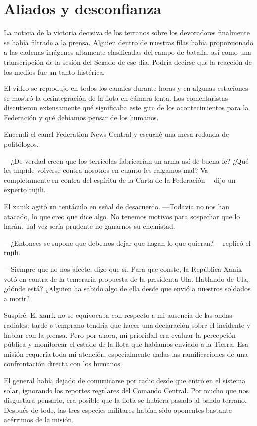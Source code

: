\chapter{Aliados y desconfianza}\label{sec:aliados-desconfianza}

La noticia de la victoria decisiva de los terranos sobre los devoradores finalmente se había filtrado a la prensa. Alguien dentro de nuestras filas había proporcionado a las cadenas imágenes altamente clasificadas del campo de batalla, así como una transcripción de la sesión del Senado de ese día. Podría decirse que la reacción de los medios fue un tanto histérica.

El video se reprodujo en todos los canales durante horas y en algunas estaciones se mostró la desintegración de la flota en cámara lenta. Los comentaristas discutieron extensamente qué significaba este giro de los acontecimientos para la Federación y qué debíamos pensar de los humanos.

Encendí el canal Federation News Central y escuché una mesa redonda de politólogos.

 —¿De verdad creen que los terrícolas fabricarían un arma así de buena fe? ¿Qué les impide volverse contra nosotros en cuanto les caigamos mal? Va completamente en contra del espíritu de la Carta de la Federación —dijo un experto tujili.

El xanik agitó un tentáculo en señal de desacuerdo. —Todavía no nos han atacado, lo que creo que dice algo. No tenemos motivos para sospechar que lo harán. Tal vez sería prudente no ganarnos su enemistad.

 —¿Entonces se supone que debemos dejar que hagan lo que quieran? —replicó el tujili.

—Siempre que no nos afecte, digo que sí. Para que conste, la República Xanik votó en contra de la temeraria propuesta de la presidenta Ula. Hablando de Ula, ¿dónde está? ¿Alguien ha sabido algo de ella desde que envió a nuestros soldados a morir?

Suspiré. El xanik no se equivocaba con respecto a mi ausencia de las ondas radiales; tarde o temprano tendría que hacer una declaración sobre el incidente y hablar con la prensa. Pero por ahora, mi prioridad era evaluar la percepción pública y monitorear el estado de la flota que habíamos enviado a la Tierra. Esa misión requería toda mi atención, especialmente dadas las ramificaciones de una confrontación directa con los humanos.

El general había dejado de comunicarse por radio desde que entró en el sistema solar, ignorando los reportes regulares del Comando Central. Por mucho que nos disgustara pensarlo, era posible que la flota se hubiera pasado al bando terrano. Después de todo, las tres especies militares habían sido oponentes bastante acérrimos de la misión.

